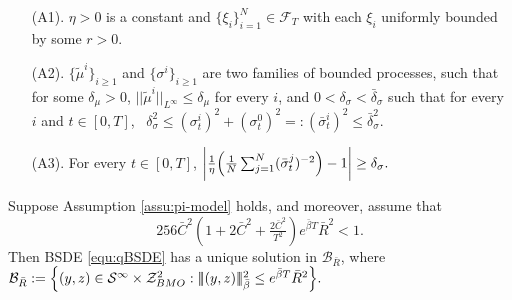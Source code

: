 \documentclass[10pt,a4paper]{amsart}
\newcommand{\MF}{{\mathcal{F}}}
\newcommand{\bC}{\bar{C}}
\newcommand{\bR}{\bar{R}}
\newcommand{\be}{\begin{equation}}
\newcommand{\ee}{\end{equation}}
\newcommand{\trinm}[1]{\vert\!\vert\!\vert #1 \vert\!\vert\!\vert}
\begin{document}
\begin{Assumption}\label{assu:pi-model} 
\begin{itemize}


\item[\textnormal{(A1).}] $\eta>0$ is a constant and $\{\xi_{i}\}_{i=1}^N \in \mathcal{F}_{T}$ with each $\xi_i$ uniformly bounded by some $r>0$. 



\item[\textnormal{(A2).}] $ \{\tilde{\mu}^{i}\}_{i \geq 1} $ {and} $ \{\sigma^{i}\}_{i \geq 1}$ are two families of bounded processes, such that for some $\delta_{\mu}>0$, $||\tilde{\mu}^{i}||_{L^{\infty}}\leq \delta_{\mu}$ for every $i$, and $ 0 < \delta_{\sigma} < \bar{\delta}_{\sigma}$ such that  for every $i$ and $t \in [0,T]$, \  $\delta_{\sigma}^{2} \leq (\sigma_{t}^{i})^{2}+(\sigma_{t}^{0})^{2} =: (\bar{\sigma}_{t}^{i})^{2} \leq \bar{\delta}_{\sigma}^{2}$.

\item[\textnormal{(A3).}] For every $t \in [0,T]$, 
$
\biggl|\tfrac{1}{\eta}\Bigl(\tfrac{1}{N}\sum_{j=1}^{N}(\bar{\sigma}_{t}^{j})^{-2}\Bigr)-1\biggr|
\geq \delta_{\sigma}. 
$
    
\end{itemize}

 




\end{Assumption}

\begin{Corollary}
\label{Cor3.4}
Suppose Assumption \ref{assu:pi-model} holds, and moreover, assume that
\be\label{assu:modelbd}
256 {\bC}^{2}(1+2 \bC^{2}+\tfrac{2 \bC^{2}}{T^{2}})e^{ \bar{\beta} T} {\bR}^{2} < 1.
\ee
Then BSDE \eqref{equ:qBSDE} has a unique solution in $\mathcal{B}_{\bR}$, where
$
\mathcal{B}_{\bR} := \Bigl\{ (y,z) \in \mathcal{S}^{\infty} \times \mathcal{Z}_{BMO}^{2}: \trinm{(y,z)}_{\bar\beta}^{2} \leq e^{\bar\beta T}\bR^{2} \Bigr\}.
$
\end{Corollary}
\end{document}
